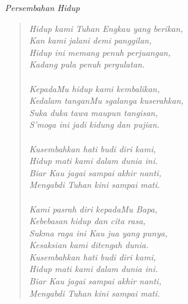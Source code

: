 \begin{center}
\itshape{Persembahan Hidup}
\end{center}

\scriptsize
\begin{verse}
	\itshape{
Hidup kami Tuhan Engkau yang berikan,\\
Kan kami jalani demi panggilan,\\
Hidup ini memang penuh perjuangan,\\
Kadang pula penuh pergulatan.\\
{~}\\
KepadaMu hidup kami kembalikan,\\
Kedalam tanganMu sgalanya kuserahkan,\\
Suka duka tawa maupun tangisan,\\
S’moga ini jadi kidung dan pujian.\\
{~}\\
Kusembahkan hati budi diri kami,\\
Hidup mati kami dalam dunia ini.\\
Biar Kau jagai sampai akhir nanti,\\
Mengabdi Tuhan kini sampai mati.\\
{~}\\
Kami pasrah diri kepadaMu Bapa,\\
Kebebasan hidup dan cita rasa,\\
Sukma raga ini Kau jua yang punya,\\
Kesaksian kami ditengah dunia.
{~}\\
Kusembahkan hati budi diri kami,\\
Hidup mati kami dalam dunia ini.\\
Biar Kau jagai sampai akhir nanti,\\
Mengabdi Tuhan kini sampai mati.}
\end{verse}
\normalsize